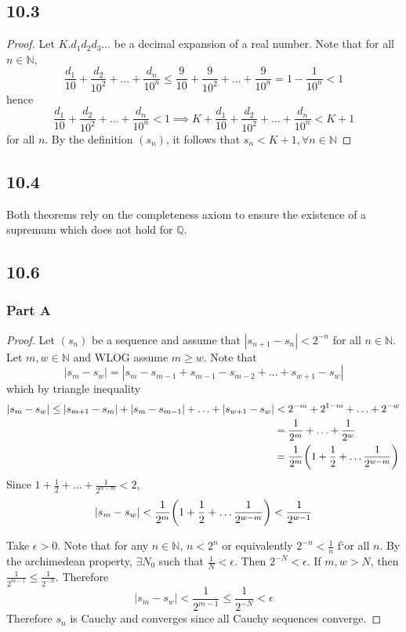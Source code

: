 \documentclass[12pt,titlepage]{extarticle}
\begin{document}
\subsection*{10.3}
\begin{proof}
    Let $K.d_1 d_2 d_3 \ldots$ be a decimal expansion of a real number. Note that for all $n \in \mathbb{N}$,
    \[
       \frac{d_1}{10} + \frac{d_2}{10^2} + \ldots + \frac{d_n}{10^n} \leq \frac{9}{10} + \frac{9}{10^2} + \ldots + \frac{9}{10^n} = 1 - \frac{1}{10^n} < 1
    \]
    hence
    \[
       \frac{d_1}{10} + \frac{d_2}{10^2} + \ldots + \frac{d_n}{10^n} < 1 \implies K + \frac{d_1}{10} + \frac{d_2}{10^2} + \ldots + \frac{d_n}{10^n} < K + 1
    \]
    for all $n$. By the definition $(s_n)$, it follows that
    $
        s_n < K + 1, \forall n \in \mathbb{N}
    $
\end{proof}

\subsection*{10.4}
Both theorems rely on the completeness axiom to ensure the existence of a supremum which does not hold for $\mathbb{Q}$.

\subsection*{10.6}
\subsubsection*{Part A}

\begin{proof}
    Let $(s_n)$ be a sequence and assume that $|s_{n+1} - s_n| < 2^{-n}$ for all $n \in \mathbb{N}$. 
    Let $m,w \in \mathbb{N}$ and WLOG assume $m \geq w$. Note that
    \[
        |s_m - s_w| = |s_m - s_{m-1} + s_{m-1} - s_{m-2} + \ldots + s_{w + 1} - s_w|
    \]
    which by triangle inequality
    \begin{align*}
        |s_m - s_w| \leq |s_{m+1} - s_m| + |s_{m} - s_{m-1}| + \ldots + |s_{w+1} - s_w| &< 2^{-m} + 2^{1-m} + \ldots + 2^{-w} \\
        &= \frac{1}{2^m} + \ldots + \frac{1}{2^w} \\
        &= \frac{1}{2^m}\qty(1 + \frac{1}{2} + \ldots \frac{1}{2^{w-m}}) \\
    \end{align*}
    Since $1 + \frac{1}{2} + \ldots + \frac{1}{2^{w-m}} < 2$,
    \[
        |s_m - s_w| < \frac{1}{2^m}\qty(1 + \frac{1}{2} + \ldots \frac{1}{2^{w-m}}) < \frac{1}{2^{w-1}}
    \]

    Take $\epsilon > 0$. Note that for any $n \in \mathbb{N}$, $n < 2^n$ or equivalently $2^{-n} < \frac{1}{n}$ f`or all $n$. By the archimedean property, $\exists N_0$ such that $\frac{1}{N} < \epsilon$. Then $2^{-N} < \epsilon$. If $m,w > N$, then $\frac{1}{2^{m-1}} \leq \frac{1}{2^{-N}}$. Therefore
    \[
        |s_m - s_w| < \frac{1}{2^{m-1}} \leq \frac{1}{2^{-N}} < \epsilon
    \]
    Therefore $s_n$ is Cauchy and converges since all Cauchy sequences converge.
\end{proof}
\end{document}
